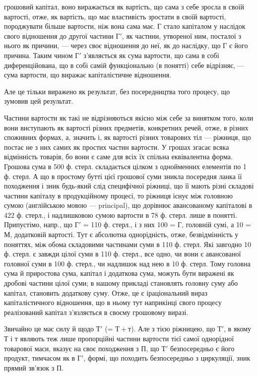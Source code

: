 \parcont{}  %
грошовий капітал, воно виражається як вартість, що сама з себе зросла
в своїй вартості, отже, як вартість, що має властивість зростати в своїй
вартості, породжувати більше вартости, ніж вона сама має. Г стало капіталом
у наслідок свого відношення до другої частини $Г'$, як частини,
утвореної ним, посталої з нього як причини, — через своє відношення до
неї, як до наслідку, що Г є його причина. Таким чином $Г'$ з’являється
як сума вартости, що сама в собі диференційована, що в собі самій функціонально
(в понятті) себе відрізняє, — сума вартости, що виражає капіталістичне
відношення.

Але це тільки виражено як результат, без посередництва того процесу,
що зумовив цей результат.

Частини вартости як такі не відрізняються якісно між себе за винятком
того, коли вони виступають як вартості різних предметів, конкретних
речей, отже, в різних споживних формах, а, значить і, як вартості
різних товарових тіл — ріжниця, що постає не з них самих як простих
частин вартости. У грошах згасає всяка відмінність товарів, бо вони є
саме для всіх їх спільна еквівалентна форма. Грошова сума в 500 ф.
стерл. складається цілком з однойменних елементів по 1 ф. стерл. А що
в простому бутті цієї грошової суми зникла посередня ланка її походження
і зник будь-який слід специфічної ріжниці, що її мають різні
складові частини капіталу в продукційному процесі, то ріжниця існує
між головною сумою (англійською мовою — principal), що дорівнює
авансованому капіталові в 422 ф. стерл., і надлишковою сумою вартости
в 78 ф. стерл. лише в понятті. Припустімо, напр., що $Г'$ = 110 ф. стерл.,
і з них 100 = Г, головній сумі, а 10 = М, додатковій вартості. Тут
є абсолютна однорідність, отже, безвідмінність у поняттях, між обома
складовими частинами суми в 110 ф. стерл. Які завгодно 10 ф. стерл.
є завжди  цілої суми в 110 ф. стерл., все одно, чи вони є  авансованої
головної суми в 100 ф. стерл., чи надлишок над нею в 10 ф. стерл.
Тому головна сума й приростова сума, капітал і додаткова сума, можуть
бути виражені як дробові частини цілої суми; в нашому прикладі  становлять
головну суму або капітал,  становить додаткову суму. Отже, це є
іраціональний вираз капіталістичного відношення, що в ньому тут наприкінці
свого процесу реалізований капітал з’язляється в своєму грошовому виразі.

Звичайно це має силу й щодо $Т'$ (= $Т + т$). Але з тією ріжницею, що
$Т'$, в якому Т і т являють теж лише пропорційні частини вартости тієї
самої однорідної товарової маси, вказує на своє походження з П, що $Т'$
безпосередньо є його продукт, тимчасом як в $Г'$, формі, що походить
безпосередньо з циркуляції, зник прямий зв’язок з П.

